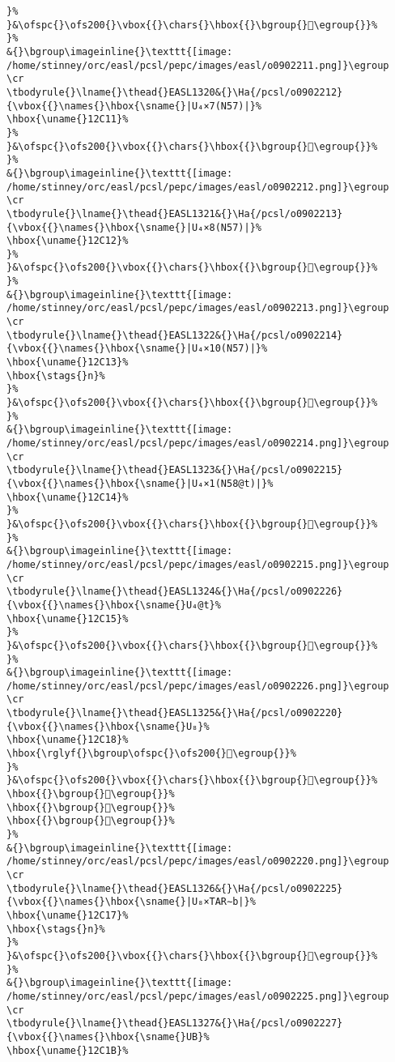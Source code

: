 \begin{verbatim}
}%
}&\ofspc{}\ofs200{}\vbox{{}\chars{}\hbox{{}\bgroup{}𒰐\egroup{}}%
}%
&{}\bgroup\imageinline{}\texttt{[image: /home/stinney/orc/easl/pcsl/pepc/images/easl/o0902211.png]}\egroup
\cr
\tbodyrule{}\lname{}\thead{}EASL1320&{}\Ha{/pcsl/o0902212}{\vbox{{}\names{}\hbox{\sname{}|U₄×7(N57)|}%
\hbox{\uname{}12C11}%
}%
}&\ofspc{}\ofs200{}\vbox{{}\chars{}\hbox{{}\bgroup{}𒰑\egroup{}}%
}%
&{}\bgroup\imageinline{}\texttt{[image: /home/stinney/orc/easl/pcsl/pepc/images/easl/o0902212.png]}\egroup
\cr
\tbodyrule{}\lname{}\thead{}EASL1321&{}\Ha{/pcsl/o0902213}{\vbox{{}\names{}\hbox{\sname{}|U₄×8(N57)|}%
\hbox{\uname{}12C12}%
}%
}&\ofspc{}\ofs200{}\vbox{{}\chars{}\hbox{{}\bgroup{}𒰒\egroup{}}%
}%
&{}\bgroup\imageinline{}\texttt{[image: /home/stinney/orc/easl/pcsl/pepc/images/easl/o0902213.png]}\egroup
\cr
\tbodyrule{}\lname{}\thead{}EASL1322&{}\Ha{/pcsl/o0902214}{\vbox{{}\names{}\hbox{\sname{}|U₄×10(N57)|}%
\hbox{\uname{}12C13}%
\hbox{\stags{}n}%
}%
}&\ofspc{}\ofs200{}\vbox{{}\chars{}\hbox{{}\bgroup{}𒰓\egroup{}}%
}%
&{}\bgroup\imageinline{}\texttt{[image: /home/stinney/orc/easl/pcsl/pepc/images/easl/o0902214.png]}\egroup
\cr
\tbodyrule{}\lname{}\thead{}EASL1323&{}\Ha{/pcsl/o0902215}{\vbox{{}\names{}\hbox{\sname{}|U₄×1(N58@t)|}%
\hbox{\uname{}12C14}%
}%
}&\ofspc{}\ofs200{}\vbox{{}\chars{}\hbox{{}\bgroup{}𒰔\egroup{}}%
}%
&{}\bgroup\imageinline{}\texttt{[image: /home/stinney/orc/easl/pcsl/pepc/images/easl/o0902215.png]}\egroup
\cr
\tbodyrule{}\lname{}\thead{}EASL1324&{}\Ha{/pcsl/o0902226}{\vbox{{}\names{}\hbox{\sname{}U₄@t}%
\hbox{\uname{}12C15}%
}%
}&\ofspc{}\ofs200{}\vbox{{}\chars{}\hbox{{}\bgroup{}𒰕\egroup{}}%
}%
&{}\bgroup\imageinline{}\texttt{[image: /home/stinney/orc/easl/pcsl/pepc/images/easl/o0902226.png]}\egroup
\cr
\tbodyrule{}\lname{}\thead{}EASL1325&{}\Ha{/pcsl/o0902220}{\vbox{{}\names{}\hbox{\sname{}U₈}%
\hbox{\uname{}12C18}%
\hbox{\rglyf{}\bgroup\ofspc{}\ofs200{}𒰘\egroup{}}%
}%
}&\ofspc{}\ofs200{}\vbox{{}\chars{}\hbox{{}\bgroup{}𒰖\egroup{}}%
\hbox{{}\bgroup{}𒰘\egroup{}}%
\hbox{{}\bgroup{}𒰙\egroup{}}%
\hbox{{}\bgroup{}𒰚\egroup{}}%
}%
&{}\bgroup\imageinline{}\texttt{[image: /home/stinney/orc/easl/pcsl/pepc/images/easl/o0902220.png]}\egroup
\cr
\tbodyrule{}\lname{}\thead{}EASL1326&{}\Ha{/pcsl/o0902225}{\vbox{{}\names{}\hbox{\sname{}|U₈×TAR∼b|}%
\hbox{\uname{}12C17}%
\hbox{\stags{}n}%
}%
}&\ofspc{}\ofs200{}\vbox{{}\chars{}\hbox{{}\bgroup{}𒰗\egroup{}}%
}%
&{}\bgroup\imageinline{}\texttt{[image: /home/stinney/orc/easl/pcsl/pepc/images/easl/o0902225.png]}\egroup
\cr
\tbodyrule{}\lname{}\thead{}EASL1327&{}\Ha{/pcsl/o0902227}{\vbox{{}\names{}\hbox{\sname{}UB}%
\hbox{\uname{}12C1B}%

\end{verbatim}
